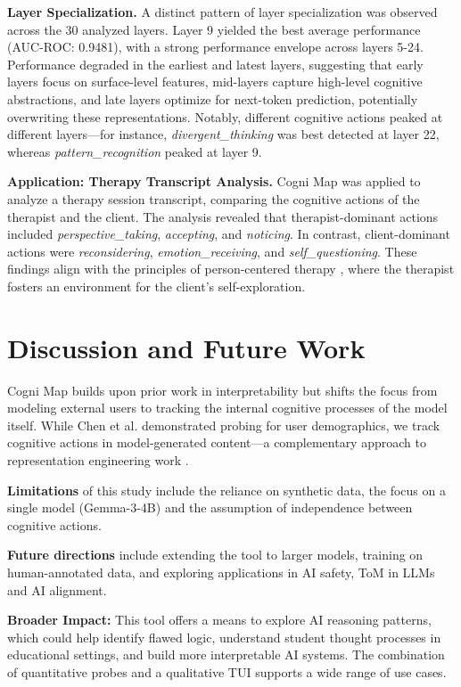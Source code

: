 \documentclass[letterpaper]{article}
\begin{document}
\textbf{Layer Specialization.} A distinct pattern of layer specialization was observed across the 30 analyzed layers. Layer 9 yielded the best average performance (AUC-ROC: 0.9481), with a strong performance envelope across layers 5-24. Performance degraded in the earliest and latest layers, suggesting that early layers focus on surface-level features, mid-layers capture high-level cognitive abstractions, and late layers optimize for next-token prediction, potentially overwriting these representations. Notably, different cognitive actions peaked at different layers—for instance, \textit{divergent\_thinking} was best detected at layer 22, whereas \textit{pattern\_recognition} peaked at layer 9.

\textbf{Application: Therapy Transcript Analysis.} Cogni Map was applied to analyze a therapy session transcript, comparing the cognitive actions of the therapist and the client. The analysis revealed that therapist-dominant actions included \textit{perspective\_taking}, \textit{accepting}, and \textit{noticing}. In contrast, client-dominant actions were \textit{reconsidering}, \textit{emotion\_receiving}, and \textit{self\_questioning}. These findings align with the principles of person-centered therapy \cite{rogers1951client}, where the therapist fosters an environment for the client's self-exploration.

\section{Discussion and Future Work}

Cogni Map builds upon prior work in interpretability \cite{alain2016understanding,chen2024designing} but shifts the focus from modeling external users to tracking the internal cognitive processes of the model itself. While Chen et al. demonstrated probing for user demographics, we track cognitive actions in model-generated content—a complementary approach to representation engineering work \cite{zou2023representation}.

\textbf{Limitations} of this study include the reliance on synthetic data, the focus on a single model (Gemma-3-4B) and the assumption of independence between cognitive actions.

\textbf{Future directions} include extending the tool to larger models, training on human-annotated data, and exploring applications in AI safety, ToM in LLMs and AI alignment.

\textbf{Broader Impact:} This tool offers a means to explore AI reasoning patterns, which could help identify flawed logic, understand student thought processes in educational settings, and build more interpretable AI systems. The combination of quantitative probes and a qualitative TUI supports a wide range of use cases.
\end{document}
